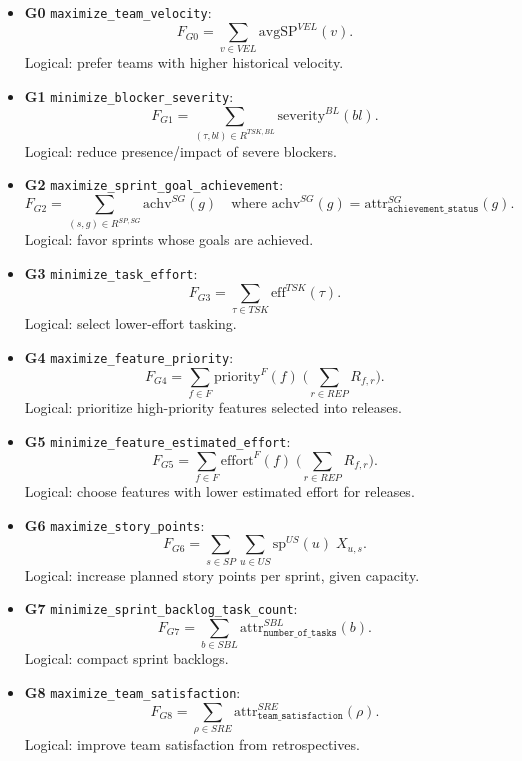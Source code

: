 \documentclass[11pt,a4paper]{article}
\begin{document}
\begin{itemize}[leftmargin=2em]
  \item \textbf{G0} \texttt{maximize\_team\_velocity}:
  \[
  F_{G0}=\sum_{v\in VEL}\mathrm{avgSP}^{VEL}(v).
  \]
  Logical: prefer teams with higher historical velocity.

  \item \textbf{G1} \texttt{minimize\_blocker\_severity}:
  \[
  F_{G1}=\sum_{(\tau,bl)\in R^{TSK,BL}}\mathrm{severity}^{BL}(bl).
  \]
  Logical: reduce presence/impact of severe blockers.

  \item \textbf{G2} \texttt{maximize\_sprint\_goal\_achievement}:
  \[
  F_{G2}=\sum_{(s,g)\in R^{SP,SG}}\mathrm{achv}^{SG}(g)
  \quad\text{where }\mathrm{achv}^{SG}(g)=\mathrm{attr}^{SG}_{\texttt{achievement\_status}}(g).
  \]
  Logical: favor sprints whose goals are achieved.

  \item \textbf{G3} \texttt{minimize\_task\_effort}:
  \[
  F_{G3}=\sum_{\tau\in TSK}\mathrm{eff}^{TSK}(\tau).
  \]
  Logical: select lower-effort tasking.

  \item \textbf{G4} \texttt{maximize\_feature\_priority}:
  \[
  F_{G4}=\sum_{f\in F}\mathrm{priority}^{F}(f)\;\Big(\sum_{r\in REP}R_{f,r}\Big).
  \]
  Logical: prioritize high-priority features selected into releases.

  \item \textbf{G5} \texttt{minimize\_feature\_estimated\_effort}:
  \[
  F_{G5}=\sum_{f\in F}\mathrm{effort}^{F}(f)\;\Big(\sum_{r\in REP}R_{f,r}\Big).
  \]
  Logical: choose features with lower estimated effort for releases.

  \item \textbf{G6} \texttt{maximize\_story\_points}:
  \[
  F_{G6}=\sum_{s\in SP}\sum_{u\in US}\mathrm{sp}^{US}(u)\;X_{u,s}.
  \]
  Logical: increase planned story points per sprint, given capacity.

  \item \textbf{G7} \texttt{minimize\_sprint\_backlog\_task\_count}:
  \[
  F_{G7}=\sum_{b\in SBL}\mathrm{attr}^{SBL}_{\texttt{number\_of\_tasks}}(b).
  \]
  Logical: compact sprint backlogs.

  \item \textbf{G8} \texttt{maximize\_team\_satisfaction}:
  \[
  F_{G8}=\sum_{\rho\in SRE}\mathrm{attr}^{SRE}_{\texttt{team\_satisfaction}}(\rho).
  \]
  Logical: improve team satisfaction from retrospectives.


\end{itemize}
\end{document}
